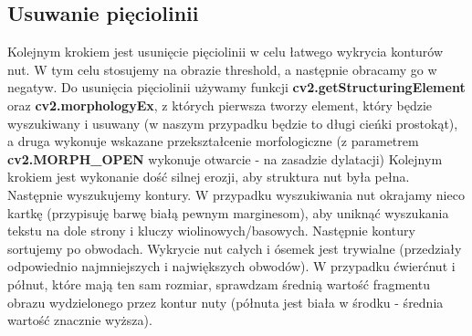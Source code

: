\documentclass[11pt]{article}
\begin{document}
\subsection{Usuwanie pięciolinii}
Kolejnym krokiem jest usunięcie pięciolinii w celu łatwego wykrycia konturów nut.
W tym celu stosujemy na obrazie threshold, a następnie obracamy go w negatyw.
Do usunięcia pięciolinii używamy funkcji \newline
\textbf{cv2.getStructuringElement} oraz \textbf{cv2.morphologyEx}, 
z których pierwsza tworzy element, który będzie wyszukiwany i usuwany (w naszym przypadku będzie to długi cieńki prostokąt), 
a druga wykonuje wskazane przekształcenie morfologiczne (z parametrem \textbf{cv2.MORPH\_OPEN} wykonuje otwarcie - na zasadzie dylatacji)
Kolejnym krokiem jest wykonanie dość silnej erozji, aby struktura nut była pełna.
Następnie wyszukujemy kontury.
W przypadku wyszukiwania nut okrajamy nieco kartkę (przypisuję barwę białą pewnym marginesom),
aby uniknąć wyszukania tekstu na dole strony i kluczy wiolinowych/basowych.
Następnie kontury sortujemy po obwodach.
Wykrycie nut całych i ósemek jest trywialne (przedziały odpowiednio najmniejszych i największych obwodów).
W przypadku ćwierćnut i półnut, które mają ten sam rozmiar, sprawdzam średnią wartość fragmentu obrazu wydzielonego
przez kontur nuty (półnuta jest biała w środku - średnia wartość znacznie wyższa).
\newline
\end{document}
